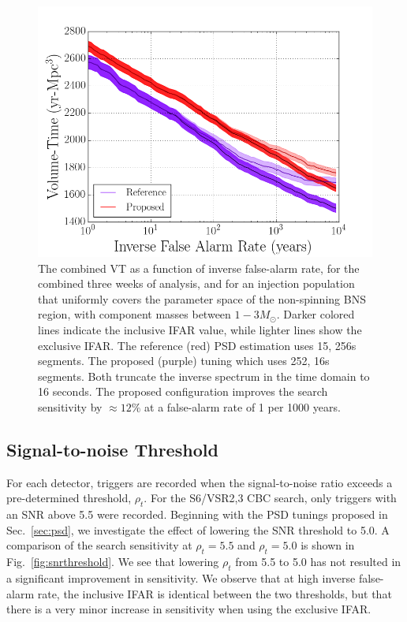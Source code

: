 \begin{figure}
\centering
\includegraphics[width=1.0\textwidth]{papers/bns_o1_dev/figures/psd_combined.png}
\caption{\label{fig:psd} 
The combined VT as a function of inverse false-alarm rate, for the combined three weeks of analysis, and for an injection population that uniformly covers the parameter space of the non-spinning BNS region, with component masses between $1- 3M_\odot$. Darker colored lines indicate the inclusive IFAR value, while lighter lines show the exclusive IFAR. The reference (red) PSD estimation uses 15, 256s segments. The proposed (purple) tuning which uses 252, 16s segments. Both truncate the inverse spectrum in the time domain to 16 seconds. The proposed configuration improves the search sensitivity by $\approx 12\% $ at a false-alarm rate of 1 per 1000 years.
}
\end{figure}

\subsection{Signal-to-noise Threshold}
\label{sec:snr}

For each detector, triggers are recorded when the signal-to-noise ratio exceeds a pre-determined threshold, $\rho_t$. For the S6/VSR2,3 CBC search, only triggers with an SNR above 5.5 were recorded. Beginning with the PSD tunings proposed in Sec.~\ref{sec:psd}, we investigate the effect of lowering the SNR threshold to 5.0. A comparison of the search sensitivity at $\rho_t=5.5$ and $\rho_t=5.0$ is shown in Fig.~\ref{fig:snrthreshold}. We see that lowering $\rho_t$ from 5.5 to 5.0 has not resulted in a significant improvement in sensitivity. We observe that at high inverse false-alarm rate, the inclusive IFAR is identical between the two thresholds, but that there is a very minor increase in sensitivity when using the exclusive IFAR.

